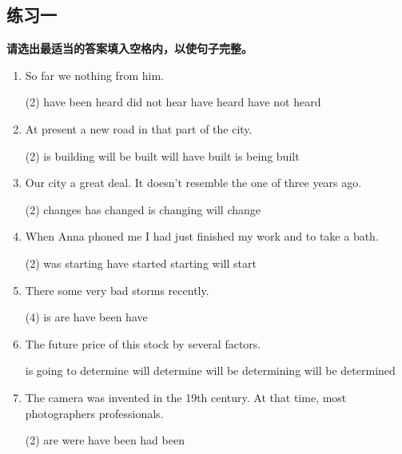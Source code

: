 \subsection{练习一}

\textbf{请选出最适当的答案填入空格内，以使句子完整。}

\begin{enumerate}
\item So far we \ttu nothing from him.
  \begin{tasks}(2)
    \task have been heard
    \task did not hear
    \task have heard
    \task have not heard
  \end{tasks}


\item At present a new road \ttu in that part of the city.
  \begin{tasks}(2)
    \task is building
    \task will be built
    \task will have built
    \task is being built
  \end{tasks}

\item Our city \ttu a great deal. It doesn't resemble the one of three years ago.
  \begin{tasks}(2)
    \task changes
    \task has changed
    \task is changing
    \task will change
  \end{tasks}

\item When Anna phoned me I had just finished my work and \ttu to take a bath.
  \begin{tasks}(2)
    \task was starting
    \task have started
    \task starting
    \task will start
  \end{tasks}

\item There \ttu some very bad storms recently.
  \begin{tasks}(4)
    \task is
    \task are
    \task have been
    \task have
  \end{tasks}

\item  The future price of this stock \ttu by several factors.
  \begin{tasks}
    \task is going to determine
    \task will determine
    \task will be determining
    \task will be determined
  \end{tasks}

\item The camera was invented in the 19th century. At that time, most photographers \ttu professionals.
  \begin{tasks}(2)
    \task are
    \task were
    \task have been
    \task had been
  \end{tasks}


\end{enumerate}
